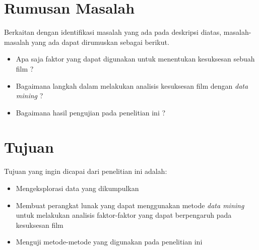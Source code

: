 \documentclass[a4paper,twoside]{article}
\begin{document}
\section{Rumusan Masalah}
Berkaitan dengan identifikasi masalah yang ada pada deskripsi diatas, masalah-masalah yang ada dapat dirumuskan sebagai berikut. 

\begin{itemize}
\item Apa saja faktor yang dapat digunakan untuk menentukan kesuksesan sebuah film ?
\item Bagaimana langkah dalam melakukan analisis kesuksesan film dengan \textit{data mining} ? 
\item Bagaimana hasil pengujian pada penelitian ini ?
\end{itemize}





\section{Tujuan}
Tujuan yang ingin dicapai dari penelitian ini adalah:  

\begin{itemize}
\item Mengeksplorasi data yang dikumpulkan
\item Membuat perangkat lunak yang dapat menggunakan metode \textit{data mining} untuk melakukan analisis faktor-faktor yang dapat berpengaruh pada kesuksesan film
\item Menguji metode-metode yang digunakan pada penelitian ini
\end{itemize} 
\end{document}
